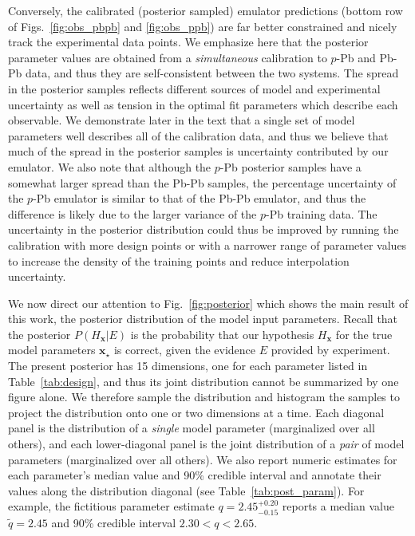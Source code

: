 \documentclass[aps,prc,reprint,amsmath,nofootinbib]{revtex4-1}
\newcommand{\xv}{\mathbf x}
\begin{document}
Conversely, the calibrated (posterior sampled) emulator predictions (bottom row of Figs.~\ref{fig:obs_pbpb} and \ref{fig:obs_ppb}) are far better constrained and nicely track the experimental data points.
We emphasize here that the posterior parameter values are obtained from a \emph{simultaneous} calibration to $p$-Pb and Pb-Pb data, and thus they are self-consistent between the two systems.
The spread in the posterior samples reflects different sources of model and experimental uncertainty as well as tension in the optimal fit parameters which describe each observable.
We demonstrate later in the text that a single set of model parameters well describes all of the calibration data, and thus we believe that much of the spread in the posterior samples is uncertainty contributed by our emulator.
We also note that although the $p$-Pb posterior samples have a somewhat larger spread than the Pb-Pb samples, the percentage uncertainty of the $p$-Pb emulator is similar to that of the Pb-Pb emulator, and thus the difference is likely due to the larger variance of the $p$-Pb training data.
The uncertainty in the posterior distribution could thus be improved by running the calibration with more design points or with a narrower range of parameter values to increase the density of the training points and reduce interpolation uncertainty.

We now direct our attention to Fig.~\ref{fig:posterior} which shows the main result of this work, the posterior distribution of the model input parameters.
Recall that the posterior $P(H_\xv | E)$ is the probability that our hypothesis $H_\xv$ for the true model parameters $\xv_\star$ is correct, given the evidence $E$ provided by experiment.
The present posterior has 15 dimensions, one for each parameter listed in Table~\ref{tab:design}, and thus its joint distribution cannot be summarized by one figure alone.
We therefore sample the distribution and histogram the samples to project the distribution onto one or two dimensions at a time.
Each diagonal panel is the distribution of a \emph{single} model parameter (marginalized over all others), and each lower-diagonal panel is the joint distribution of a \emph{pair} of model parameters (marginalized over all others).
We also report numeric estimates for each parameter's median value and 90\% credible interval and annotate their values along the distribution diagonal (see Table~\ref{tab:post_param}).
For example, the fictitious parameter estimate $q=2.45_{-0.15}^{+0.20}$ reports a median value $\tilde{q}=2.45$ and 90\% credible interval $2.30 < q < 2.65$.
\newpage
\end{document}
